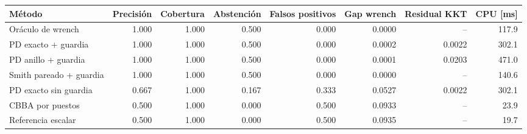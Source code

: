 \begin{tabular}{lrrrrrrr}
\toprule
Método & Precisión & Cobertura & Abstención & Falsos positivos & Gap wrench & Residual KKT & CPU [ms] \\
\midrule
Oráculo de wrench & 1.000 & 1.000 & 0.500 & 0.000 & 0.0000 & -- & 117.9 \\
PD exacto + guardia & 1.000 & 1.000 & 0.500 & 0.000 & 0.0002 & 0.0022 & 302.1 \\
PD anillo + guardia & 1.000 & 1.000 & 0.500 & 0.000 & 0.0001 & 0.0203 & 471.0 \\
Smith pareado + guardia & 1.000 & 1.000 & 0.500 & 0.000 & 0.0000 & -- & 140.6 \\
PD exacto sin guardia & 0.667 & 1.000 & 0.167 & 0.333 & 0.0527 & 0.0022 & 302.1 \\
CBBA por puestos & 0.500 & 1.000 & 0.000 & 0.500 & 0.0933 & -- & 23.9 \\
Referencia escalar & 0.500 & 1.000 & 0.000 & 0.500 & 0.0935 & -- & 19.7 \\
\bottomrule
\end{tabular}
